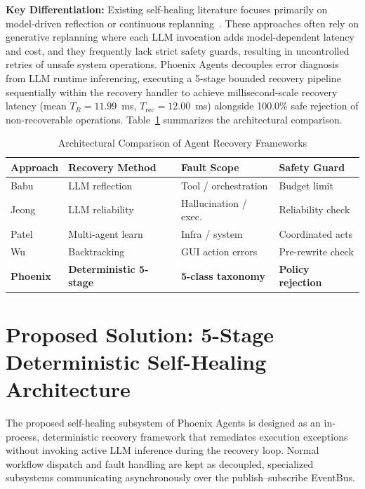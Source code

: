 \documentclass[conference]{IEEEtran}
\begin{document}
\textbf{Key Differentiation:} Existing self-healing literature focuses primarily on model-driven reflection or continuous replanning~\cite{babu2026,jeong2026,patel2026a}. These approaches often rely on generative replanning where each LLM invocation adds model-dependent latency and cost, and they frequently lack strict safety guards, resulting in uncontrolled retries of unsafe system operations. Phoenix Agents decouples error diagnosis from LLM runtime inferencing, executing a 5-stage bounded recovery pipeline sequentially within the recovery handler to achieve millisecond-scale recovery latency (mean $T_R = 11.99$~ms, $T_{\text{rec}} = 12.00$~ms) alongside 100.0\% safe rejection of non-recoverable operations. Table~\ref{tab:comparison} summarizes the architectural comparison.

\begin{table}[t]
\centering
\caption{Architectural Comparison of Agent Recovery Frameworks}
\label{tab:comparison}
\footnotesize
\setlength{\tabcolsep}{2pt}
\begin{tabularx}{\columnwidth}{p{}p{}p{}X}
\toprule
\textbf{Approach} & \textbf{Recovery Method} & \textbf{Fault Scope} & \textbf{Safety Guard} \\
\midrule
Babu~\cite{babu2026} & LLM reflection & Tool / orchestration & Budget limit \\
Jeong~\cite{jeong2026} & LLM reliability & Hallucination / exec. & Reliability check \\
Patel~\cite{patel2026b} & Multi-agent learn & Infra / system & Coordinated acts \\
Wu~\cite{wu2025} & Backtracking & GUI action errors & Pre-rewrite check \\
\textbf{Phoenix} & \textbf{Deterministic 5-stage} & \textbf{5-class taxonomy} & \textbf{Policy rejection} \\
\bottomrule
\end{tabularx}
\end{table}

\section{Proposed Solution: 5-Stage Deterministic Self-Healing Architecture}
The proposed self-healing subsystem of Phoenix Agents is designed as an in-process, deterministic recovery framework that remediates execution exceptions without invoking active LLM inference during the recovery loop. Normal workflow dispatch and fault handling are kept as decoupled, specialized subsystems communicating asynchronously over the publish--subscribe EventBus.
\end{document}
